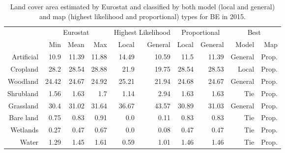     \begin{table}[H]
    \centering
    \caption{Land cover area estimated by Eurostat and classified by both model (local and general) and map (highest likelihood and proportional) types for BE in 2015.}
    
    \begin{tabular}{r|rrr|rr|rr|rr}
    \toprule
    {} & \multicolumn{3}{|c}{Eurostat} & \multicolumn{2}{|c}{Highest Likelihood} & \multicolumn{2}{|c}{Proportional} & \multicolumn{2}{|c}{Best} \\
    {} &      Min &   Mean &    Max &              Local & General &        Local & General &    Model &    Map \\
    \midrule
    Artificial &     10.9 &  11.39 &  11.88 &              14.49 &   10.59 &         11.5 &   11.39 &  General &  Prop. \\
    Cropland   &     28.2 &  28.54 &  28.88 &               21.9 &   19.75 &        28.54 &   28.53 &    Local &  Prop. \\
    Woodland   &    24.42 &  24.67 &  24.92 &              25.21 &   21.94 &        24.68 &   24.67 &  General &  Prop. \\
    Shrubland  &     1.56 &   1.63 &    1.7 &               1.14 &    2.94 &         1.63 &    1.63 &      Tie &  Prop. \\
    Grassland  &     30.4 &  31.02 &  31.64 &              36.67 &   43.57 &        30.89 &   31.03 &  General &  Prop. \\
    Bare land  &     0.75 &   0.83 &   0.91 &                0.0 &    0.11 &         0.83 &    0.83 &      Tie &  Prop. \\
    Wetlands   &     0.27 &   0.47 &   0.67 &                0.0 &    0.08 &         0.47 &    0.47 &      Tie &  Prop. \\
    Water      &     1.29 &   1.45 &   1.61 &               0.59 &    1.01 &         1.46 &    1.46 &      Tie &  Prop. \\
    \bottomrule
    \end{tabular}
    \end{table}
    
